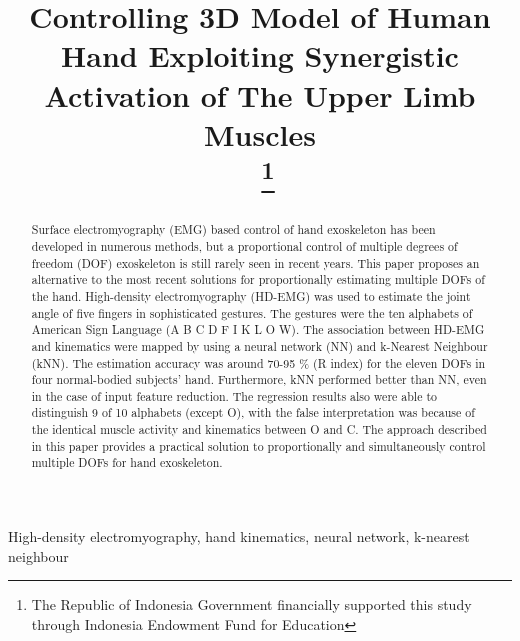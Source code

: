 \documentclass[conference]{IEEEtran}
\begin{document}
\title{Controlling 3D Model of Human Hand Exploiting Synergistic Activation of 
The Upper Limb Muscles\\\
\thanks{
The Republic of Indonesia Government financially supported this study through Indonesia Endowment Fund for Education}
}

\author{
}

\maketitle

\begin{abstract}
Surface electromyography (EMG) based control of hand exoskeleton has been developed in numerous methods, but a proportional control of multiple degrees of freedom (DOF) exoskeleton is still rarely seen in recent years. This paper proposes an alternative to the most recent solutions for proportionally estimating multiple DOFs of the hand. High-density electromyography (HD-EMG) was used to estimate the joint angle of five fingers in sophisticated gestures. The gestures were the ten alphabets of American Sign Language (A B C D F I K L O W). The association between HD-EMG and kinematics were mapped by using a neural network (NN) and k-Nearest Neighbour (kNN). The estimation accuracy was around 70-95 \% (R index) for the eleven DOFs in four normal-bodied subjects’ hand. Furthermore, kNN performed better than NN, even in the case of input feature reduction. The regression results also were able to distinguish 9 of 10 alphabets (except O), with the false interpretation was because of the identical muscle activity and kinematics between O and C. The approach described in this paper provides a practical solution to proportionally and simultaneously control multiple DOFs for hand exoskeleton.
\end{abstract}

\begin{IEEEkeywords}
High-density electromyography, hand kinematics, neural network, k-nearest 
neighbour
\end{IEEEkeywords}
\end{document}
